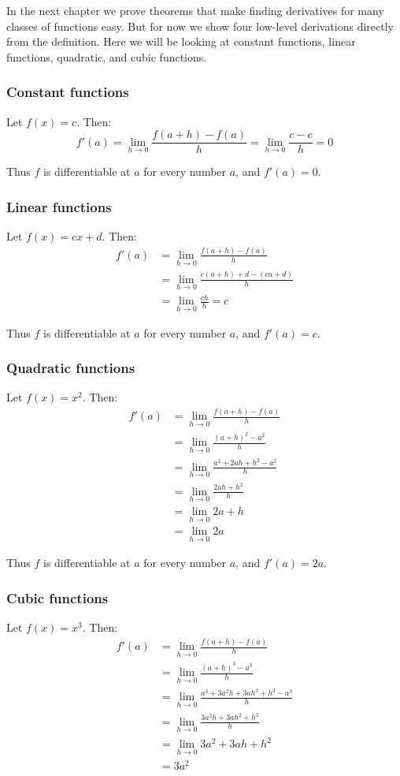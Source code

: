 In the next chapter we prove theorems that make finding derivatives
for many classes of functions easy. But for now we show four low-level
derivations directly from the definition. Here we will be looking at
constant functions, linear functions, quadratic, and cubic functions.

\subsubsection*{Constant functions}
Let $f(x)=c$. Then:
\[f'(a)=\lim_{h\to0}\frac{f(a+h)-f(a)}{h}=\lim_{h\to0}\frac{c-c}{h}=0\]

Thus $f$ is differentiable at $a$ for every number $a$, and $f'(a)=0$.

\subsubsection*{Linear functions}
Let $f(x)=cx+d$. Then:
\begin{align*}
  f'(a)&=\lim_{h\to0}\frac{f(a+h)-f(a)}{h}\\
       &=\lim_{h\to0}\frac{c(a+h)+d-(ca+d)}{h}\\
       &=\lim_{h\to0}\frac{ch}{h}=c
\end{align*}

Thus $f$ is differentiable at $a$ for every number $a$, and $f'(a)=c$.

\subsubsection*{Quadratic functions}
Let $f(x)=x^2$. Then:
\begin{align*}
  f'(a)&=\lim_{h\to0}\frac{f(a+h)-f(a)}{h}\\
       &=\lim_{h\to0}\frac{(a+h)^2-a^2}{h}\\
       &=\lim_{h\to0}\frac{a^2+2ah+h^2-a^2}{h}\\
       &=\lim_{h\to0}\frac{2ah+h^2}{h}\\
       &=\lim_{h\to0}2a+h\\
       &=\lim_{h\to0}2a
\end{align*}

Thus $f$ is differentiable at $a$ for every number $a$, and $f'(a)=2a$.

\subsubsection*{Cubic functions}
Let $f(x)=x^3$. Then:
\begin{align*}
  f'(a)&=\lim_{h\to0}\frac{f(a+h)-f(a)}{h}\\
       &=\lim_{h\to0}\frac{(a+h)^3-a^3}{h}\\
       &=\lim_{h\to0}\frac{a^3+3a^2h+3ah^2+h^3-a^3}{h}\\
       &=\lim_{h\to0}\frac{3a^2h+3ah^2+h^3}{h}\\
       &=\lim_{h\to0}3a^2+3ah+h^2\\
       &=3a^2
\end{align*}

